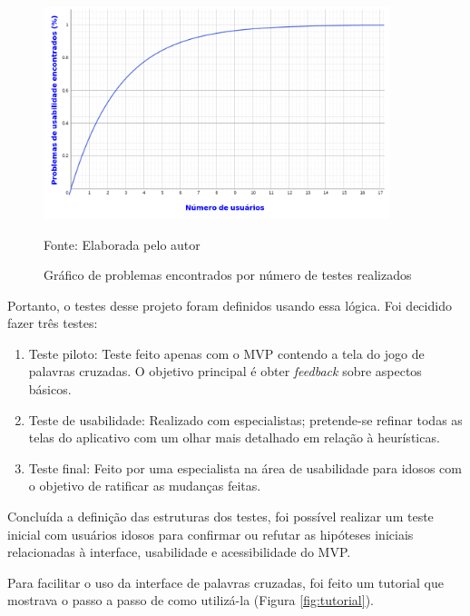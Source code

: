 \begin{figure}[H]
\centering
    \caption{Gráfico de problemas encontrados por número de testes realizados}
    \label{fig:graphnielsen}
    \includegraphics[width=0.9\textwidth]{Figuras/graphNielsen.png}
    
    Fonte: Elaborada pelo autor
\end{figure}

Portanto, o testes desse projeto foram definidos usando essa lógica. Foi decidido fazer três testes:

\begin{enumerate}
    \item Teste piloto: Teste feito apenas com o MVP contendo a tela do jogo de palavras cruzadas. O objetivo principal é obter \textit{feedback} sobre aspectos básicos.
    \item Teste de usabilidade: Realizado com especialistas; pretende-se refinar todas as telas do aplicativo com um olhar mais detalhado em relação à heurísticas.
    \item Teste final: Feito por uma especialista na área de usabilidade para idosos com o objetivo de ratificar as mudanças feitas.
\end{enumerate}

Concluída a definição das estruturas dos testes, foi possível realizar um teste inicial com usuários idosos para confirmar ou refutar as hipóteses iniciais relacionadas à interface, usabilidade e acessibilidade do MVP.

Para facilitar o uso da interface de palavras cruzadas, foi feito um tutorial que mostrava o passo a passo de como utilizá-la (Figura \ref{fig:tutorial}). 

